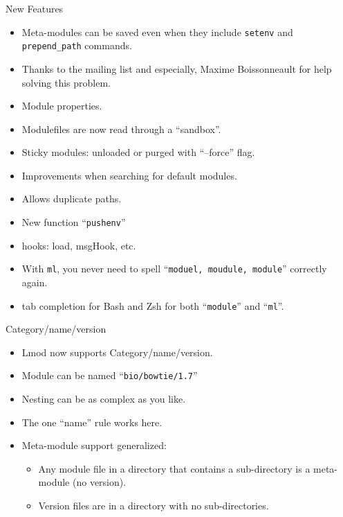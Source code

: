 \documentclass{beamer}
\begin{document}
\begin{frame}{New Features}
  \begin{itemize}
    \item Meta-modules can be saved even when they include \texttt{setenv}
      and \texttt{prepend\_path} commands.
    \item Thanks to the mailing list and especially, Maxime
      Boissonneault for help solving this problem.
    \item Module properties.
    \item Modulefiles are now read through a ``sandbox''.
    \item Sticky modules: unloaded or purged with ``--force'' flag.
    \item Improvements when searching for default modules.
    \item Allows duplicate paths.
    \item New function ``\texttt{pushenv}''
    \item hooks: load, msgHook, etc.
    \item With \texttt{ml}, you never need to spell ``\texttt{moduel, moudule, module}''
      correctly again.
    \item tab completion for Bash and Zsh for both ``\texttt{module}'' and ``\texttt{ml}''.
  \end{itemize}
\end{frame}


\begin{frame}{Category/name/version}
  \begin{itemize}
    \item Lmod now supports Category/name/version.
    \item Module can be named ``\texttt{bio/bowtie/1.7}''
    \item Nesting can be as complex as you like.
    \item The one ``name'' rule works here.
    \item Meta-module support generalized:
      \begin{itemize}
        \item Any module file in a directory that contains a
          sub-directory is a meta-module (no version).
        \item Version files are in a directory with no sub-directories.
      \end{itemize}
  \end{itemize}
\end{frame}
\end{document}
